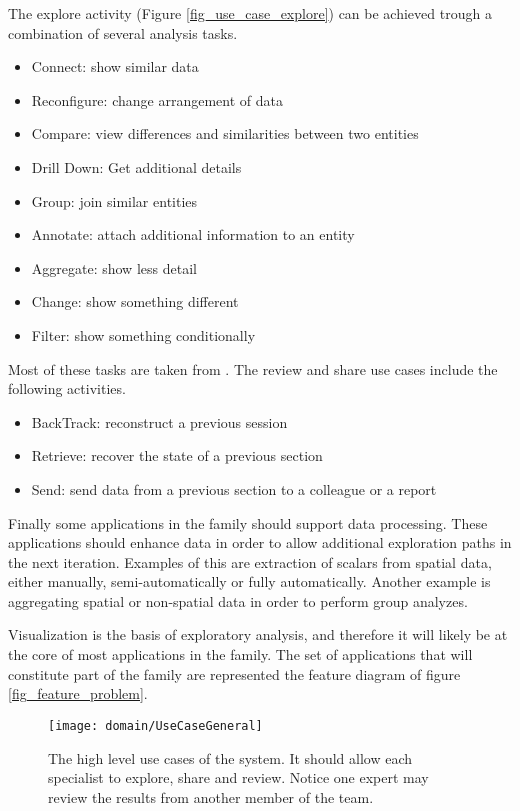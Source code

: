 The explore activity (Figure \ref{fig_use_case_explore}) can be achieved trough a combination of several analysis tasks.
\begin{itemize}
	\item Connect: show similar data
	\item Reconfigure: change arrangement of data
	\item Compare: view differences and similarities between two entities
	\item Drill Down: Get additional details
	\item Group: join similar entities
	\item Annotate: attach additional information to an entity
	\item Aggregate: show less detail
	\item Change: show something different
	\item Filter: show something conditionally
\end{itemize}
 Most of these tasks are taken from \autocite{yi_toward_2007}. The review and share use cases include the following activities. 
\begin{itemize}
	\item BackTrack: reconstruct a previous session
	\item Retrieve: recover the state of a previous section
	\item Send: send data from a previous section to a colleague or a report
\end{itemize}
Finally some applications in the family should support data processing. These applications should enhance data in order to allow additional exploration paths in the next iteration. Examples of this are extraction of scalars from spatial data, either manually, semi-automatically or fully automatically. Another example is aggregating spatial or non-spatial data in order to perform group analyzes.
 
Visualization is the basis of exploratory analysis, and therefore it will likely be at the core of most applications in the family. The set of applications that will constitute part of the family are represented the feature diagram of figure \ref{fig_feature_problem}.

\begin{figure}
\centering
\texttt{[image: domain/UseCaseGeneral]}
\caption{The high level use cases of the system. It should allow each specialist to explore, share and review. Notice one expert may review the results from another member of the team.\label{fig_use_case_general}}
\end{figure}

